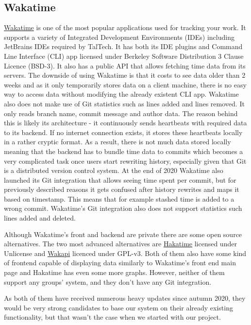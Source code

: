 \subsection{Wakatime}\label{subsec:wakatime}
\href{https://wakatime.com/about}{Wakatime} is one of the most popular applications used for tracking your work.
It supports a variety of Integrated Development Environments (IDEs) including JetBrains IDEs required by TalTech.
It has both its IDE plugins and Command Line Interface (CLI) app licensed under Berkeley Software Distribution 3 Clause Licence (BSD-3).
It also has a public API that allows fetching time data from its servers.
The downside of using Wakatime is that it costs to see data older than 2 weeks and as it only temporarily
stores data on a client machine, there is no easy way to access data without modifying the already existent CLI app.
Wakatime also does not make use of Git statistics such as lines added and lines removed.
It only reads branch name, commit message and author data.
The reason behind this is likely its architecture - it continuously sends heartbeats with required data to its backend.
If no internet connection exists, it stores these heartbeats locally in a rather cryptic format.
As a result, there is not much data stored locally meaning that the backend has to bundle time data to commits which becomes a very complicated task
once users start rewriting history, especially given that Git is a distributed version control system.
At the end of 2020 Wakatime also launched its Git integration that allows seeing time spent per commit, but for previously
described reasons it gets confused after history rewrites and maps it based on timestamp.
This means that for example stashed time is added to a wrong commit.
Wakatime's Git integration also does not support statistics such lines added and deleted.

Although Wakatime's front and backend are private there are some open source alternatives.
The two most advanced alternatives are \href{https://github.com/mujx/hakatime}{Hakatime} licensed under Unlicense and
\href{https://github.com/muety/wakapi}{Wakapi} licenced under GPL-v3.
Both of them also have some kind of frontend capable of displaying data similarly to Wakatime's front end main page and
Hakatime has even some more graphs.
However, neither of them support any groups' system, and they don't have any Git integration.

As both of them have received numerous heavy updates since autumn 2020, they would be very strong candidates to base
our system on their already existing functionality, but that wasn't the case when we started with our project.


